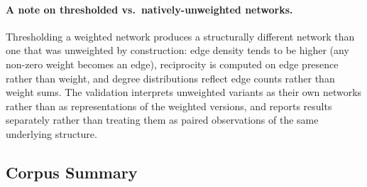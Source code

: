 \documentclass[11pt]{article}
\begin{document}
\paragraph{A note on thresholded vs.\ natively-unweighted networks.} Thresholding a weighted network produces a structurally different network than one that was unweighted by construction: edge density tends to be higher (any non-zero weight becomes an edge), reciprocity is computed on edge presence rather than weight, and degree distributions reflect edge counts rather than weight sums. The validation interprets unweighted variants as their own networks rather than as representations of the weighted versions, and reports results separately rather than treating them as paired observations of the same underlying structure.

\subsection{Corpus Summary}
\end{document}
